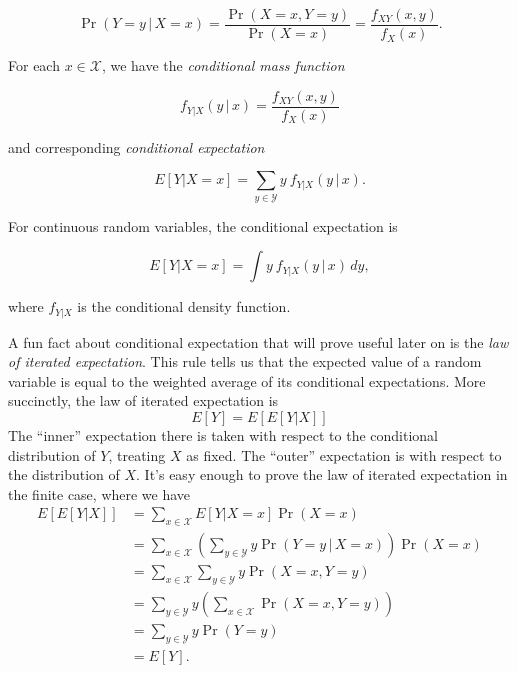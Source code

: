 \documentclass[12pt,oneside,openany]{book}
\begin{document}
\begin{equation}
\Pr(Y = y \,|\, X = x)
= \frac{\Pr(X = x, Y = y)}{\Pr(X = x)}
= \frac{f_{XY}(x, y)}{f_X(x)}.
\end{equation}

For each \(x \in \mathcal{X}\), we have the \emph{conditional mass
function}

\begin{equation}
f_{Y|X}(y \,|\, x) = \frac{f_{XY}(x, y)}{f_X(x)}
\end{equation}

and corresponding \emph{conditional expectation}

\begin{equation}
E[Y | X = x]
= \sum_{y \in \mathcal{Y}} y \: f_{Y|X}(y \,|\, x).
\end{equation}

For continuous random variables, the conditional expectation is

\begin{equation}
E[Y | X = x]
= \int y \: f_{Y|X} (y \,|\, x) \, dy,
\end{equation}

where \(f_{Y|X}\) is the conditional density function.

A fun fact about conditional expectation that will prove useful later on
is the \emph{law of iterated expectation}. This rule tells us that the
expected value of a random variable is equal to the weighted average of
its conditional expectations. More succinctly, the law of iterated
expectation is \[
E[Y] = E[ E[Y | X] ]
\] The ``inner'' expectation there is taken with respect to the
conditional distribution of \(Y\), treating \(X\) as fixed. The
``outer'' expectation is with respect to the distribution of \(X\). It's
easy enough to prove the law of iterated expectation in the finite case,
where we have \[
\begin{aligned}
E[ E[Y | X] ]
&= \sum_{x \in \mathcal{X}} E[Y | X = x] \Pr(X = x) \\
&= \sum_{x \in \mathcal{X}} \left( \sum_{y \in \mathcal{Y}} y \Pr(Y = y \,|\, X = x) \right) \Pr(X = x) \\
&= \sum_{x \in \mathcal{X}} \sum_{y \in \mathcal{Y}} y \Pr(X = x, Y = y) \\
&= \sum_{y \in \mathcal{Y}} y \left( \sum_{x \in \mathcal{X}} \Pr(X = x, Y = y) \right) \\
&= \sum_{y \in \mathcal{Y}} y \Pr(Y = y) \\
&= E[Y].
\end{aligned}
\]
\end{document}
